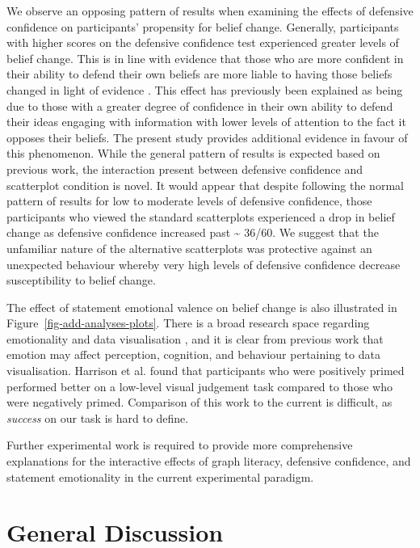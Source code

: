 \documentclass[sigconf]{acmart}
\begin{document}
We observe an opposing pattern of results when examining the effects of
defensive confidence on participants' propensity for belief change.
Generally, participants with higher scores on the defensive confidence
test experienced greater levels of belief change. This is in line with
evidence that those who are more confident in their ability to defend
their own beliefs are more liable to having those beliefs changed in
light of evidence \citep{albarracin_2004}. This effect has previously
been explained as being due to those with a greater degree of confidence
in their own ability to defend their ideas engaging with information
with lower levels of attention to the fact it opposes their beliefs. The
present study provides additional evidence in favour of this phenomenon.
While the general pattern of results is expected based on previous work,
the interaction present between defensive confidence and scatterplot
condition is novel. It would appear that despite following the normal
pattern of results for low to moderate levels of defensive confidence,
those participants who viewed the standard scatterplots experienced a
drop in belief change as defensive confidence increased past
\textasciitilde{} 36/60. We suggest that the unfamiliar nature of the
alternative scatterplots was protective against an unexpected behaviour
whereby very high levels of defensive confidence decrease susceptibility
to belief change.

The effect of statement emotional valence on belief change is also
illustrated in Figure~\ref{fig-add-analyses-plots}. There is a broad
research space regarding emotionality and data visualisation
\citep{lan_2023}, and it is clear from previous work that emotion may
affect perception, cognition, and behaviour
\citep{phelps_2006, harrison_2013, thoresen_2016} pertaining to data
visualisation. Harrison et al. \citep{harrison_2013} found that
participants who were positively primed performed better on a low-level
visual judgement task compared to those who were negatively primed.
Comparison of this work to the current is difficult, as \emph{success}
on our task is hard to define.

Further experimental work is required to provide more comprehensive
explanations for the interactive effects of graph literacy, defensive
confidence, and statement emotionality in the current experimental
paradigm.

\section{General Discussion}\label{sec-general-discussion}
\end{document}
